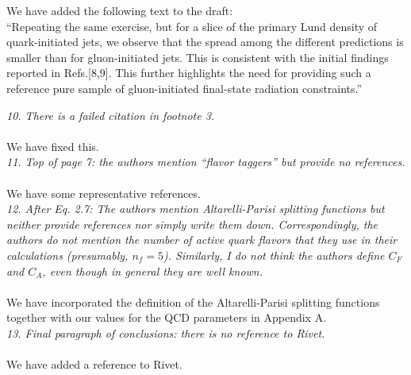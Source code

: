 \documentclass[a4paper,11pt]{article}
\begin{document}
We have added the following text to the draft:
\\

``Repeating the same exercise, but for a slice of the primary Lund density of quark-initiated jets, we observe that the spread among the different predictions is smaller than for gluon-initiated jets. This is consistent with the initial findings reported in Refs.[8,9]. This further highlights the need for providing such a reference pure sample of gluon-initiated final-state radiation constraints.''

\noindent\textit{10. There is a failed citation in footnote 3.}
\\
\\
We have fixed this.
\\

\noindent\textit{11. Top of page 7: the authors mention “flavor taggers” but provide no references.
}
\\
\\
We have some representative references.
\\

\noindent\textit{12. After Eq. 2.7: The authors mention
  Altarelli-Parisi splitting functions but neither provide references
  nor simply write them down. Correspondingly, the authors do not
  mention the number of active quark flavors that they use in their
  calculations (presumably, $n_f=5$). Similarly, I do not think the
  authors define $C_F$ and $C_A$, even though in general they are well known.}
\\
\\
We have incorporated the definition of the Altarelli-Parisi splitting functions together with our values for the QCD parameters in Appendix A.
\\

\noindent\textit{13. Final paragraph of conclusions: there is no reference to Rivet.}
\\
\\
We have added a reference to Rivet.
\\
\end{document}
